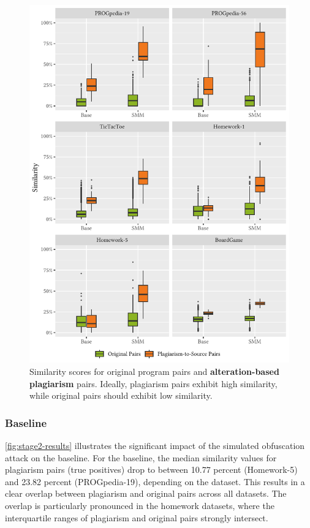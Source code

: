 \begin{figure}
\centering
\includegraphics[width=\linewidth]{figures/disseval/eval-alteration_avg.similarity.pdf}
\caption[Evaluation Results: Alteration-based Obfuscation]{Similarity scores for original program pairs and \textbf{alteration-based plagiarism} pairs. Ideally, plagiarism pairs exhibit high similarity, while original pairs should exhibit low similarity.}
\label{fig:stage2-results}
\end{figure}

 

\subsubsection{Baseline}
%
\autoref{fig:stage2-results} illustrates the significant impact of the simulated obfuscation attack on the baseline.
For the baseline, the median similarity values for plagiarism pairs (true positives) drop to between 10.77 percent (Homework-5) and 23.82 percent (PROGpedia-19), depending on the dataset.
This results in a clear overlap between plagiarism and original pairs across all datasets.
The overlap is particularly pronounced in the homework datasets, where the interquartile ranges of plagiarism and original pairs strongly intersect.


